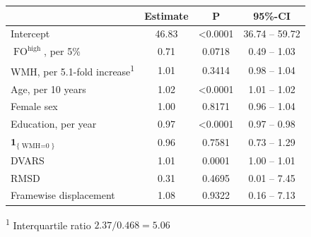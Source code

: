     \centering
    \setlength{\LTpost}{0mm}
    \begin{longtable}{lccc}
    \toprule
    & Estimate & P & 95\%-CI \\ 
    \midrule
    Intercept & 46.83 & <0.0001 & 36.74 -- 59.72 \\ 
    $\operatorname{FO}^{\text{high}}$, per 5\%  & 0.71 & 0.0718 & 0.49 -- 1.03 \\ 
    WMH, per 5.1-fold increase\textsuperscript{1}  & 1.01 & 0.3414 & 0.98 -- 1.04 \\ 
    Age, per 10 years & 1.02 & <0.0001 & 1.01 -- 1.02 \\ 
    Female sex & 1.00 & 0.8171 & 0.96 -- 1.04 \\ 
    Education, per year  & 0.97 & <0.0001 & 0.97 -- 0.98 \\ 
    $\mathbf{1}_{\{\operatorname{WMH=0}\}}$ & 0.96 & 0.7581 & 0.73 -- 1.29 \\ 
    DVARS & 1.01 & 0.0001 & 1.00 -- 1.01 \\ 
    RMSD & 0.31 & 0.4695 & 0.01 -- 7.45 \\ 
    Framewise displacement & 1.08 & 0.9322 & 0.16 -- 7.13 \\ 
    \bottomrule
    \end{longtable}
    \textsuperscript{1} Interquartile ratio $2.37/0.468=5.06$
